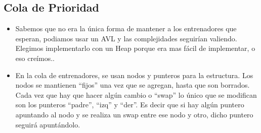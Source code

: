 \subsection{Cola de Prioridad}

\begin{itemize}

\item{Sabemos que no era la \'unica forma de mantener a los entrenadores que esperan, podiamos usar un AVL y las complejidades seguir\'ian valiendo. Elegimos implementarlo con un Heap porque era mas f\'acil de implementar, o eso cre\'imos..}

\item{En la cola de entrenadores, se usan nodos y punteros para la estructura. Los nodos se mantienen ``fijos'' una vez que se agregan, hasta que son borrados. Cada vez que hay que hacer alg\'un cambio o ``swap'' lo \'unico que se modifican son los punteros ``padre'', ``izq'' y ``der''. Es decir que si hay alg\'un puntero apuntando al nodo y se realiza un swap entre ese nodo y otro, dicho puntero seguir\'a apunt\'andolo.}

\end{itemize}


